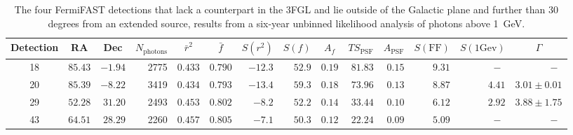 \documentclass[useAMS,usenatbib]{mn2e}
\begin{document}
\begin{table}
  \caption{The four FermiFAST detections that lack a
    counterpart in the 3FGL and lie outside of the Galactic plane and
    further than 30 degrees from an extended source, results from a
    six-year unbinned likelihood analysis of photons above 1~GeV.}
  \label{tab:fermisig1GeV}
\begin{tabular}{crrrrrrrrrrrrr}
    \hline
    Detection & \multicolumn{1}{c}{RA} & \multicolumn{1}{c}{Dec}  & \multicolumn{1}{c}{$N_\mathrm{photons}$}  &\multicolumn{1}{c}{$\bar r^2$} & \multicolumn{1}{c}{$\bar f$} & \multicolumn{1}{c}{$S(r^2)$} & \multicolumn{1}{c}{$S(f)$} & \multicolumn{1}{c}{$A_f$} & \multicolumn{1}{c}{$TS_\mathrm{PSF}$} & \multicolumn{1}{c}{$A_\mathrm{PSF}$} & \multicolumn{1}{c}{$S(\mathrm{FF})$} & \multicolumn{1}{c}{$S(\mathrm{1Gev})$}  & \multicolumn{1}{c}{$\Gamma$}
 \\
    \hline
   18  & $ 85.43$ & $ -1.94$ &   2775 & $0.433$ & $0.790$ & $ -12.3$ & $  52.9$ & $0.19$ & $    81.83$ & $0.15$ & $     9.31$ & $~-~$    & $~-~$\\ 
   20  & $ 85.39$ & $ -8.22$ &   3419 & $0.434$ & $0.793$ & $ -13.4$ & $  59.3$ & $0.18$ & $    73.96$ & $0.13$ & $     8.87$ & $4.41$ & $3.01\pm0.01$ \\
   29  & $ 52.28$ & $ 31.20$ &   2493 & $0.453$ & $0.802$ & $  -8.2$ & $  52.2$ & $0.14$ & $    33.44$ & $0.10$ & $     6.12$ & $2.92$ & $3.88\pm1.75$ \\
   43  & $ 64.51$ & $ 28.29$ &   2260 & $0.457$ & $0.805$ & $  -7.1$ & $  50.3$ & $0.12$ & $    22.24$ & $0.09$ & $     5.09$ & $~-~$    & $~-~$ \\ 
\end{tabular}
\end{table}


\end{document}
